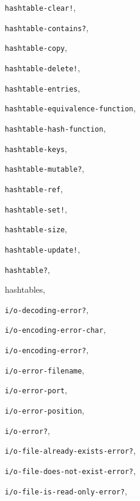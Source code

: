 {\begin{multicols}{2}
\texttt{hashtable-clear!}, \textit{\pageref{objects_s287}}
  
\texttt{hashtable-contains?}, \textit{\pageref{objects_s282}}
  
\texttt{hashtable-copy}, \textit{\pageref{objects_s286}}
  
\texttt{hashtable-delete!}, \textit{\pageref{objects_s284}}
  
\texttt{hashtable-entries}, \textit{\pageref{objects_s289}}
  
\texttt{hashtable-equivalence-function}, \textit{\pageref{objects_s278}}
  
\texttt{hashtable-hash-function}, \textit{\pageref{objects_s278}}
  
\texttt{hashtable-keys}, \textit{\pageref{objects_s288}}
  
\texttt{hashtable-mutable?}, \textit{\pageref{objects_s277}}
  
\texttt{hashtable-ref}, \textit{\pageref{objects_s281}}
  
\texttt{hashtable-set!}, \textit{\pageref{objects_s280}}
  
\texttt{hashtable-size}, \textit{\pageref{objects_s285}}
  
\texttt{hashtable-update!}, \textit{\pageref{objects_s283}}
  
\texttt{hashtable?}, \textit{\pageref{objects_s25}}
  
hashtables, \pageref{objects_s272}
  
\texttt{i/o-decoding-error?}, \textit{\pageref{exceptions_s42}}
  
\texttt{i/o-encoding-error-char}, \textit{\pageref{exceptions_s43}}
  
\texttt{i/o-encoding-error?}, \textit{\pageref{exceptions_s43}}
  
\texttt{i/o-error-filename}, \textit{\pageref{exceptions_s36}}
  
\texttt{i/o-error-port}, \textit{\pageref{exceptions_s41}}
  
\texttt{i/o-error-position}, \textit{\pageref{exceptions_s35}}
  
\texttt{i/o-error?}, \textit{\pageref{exceptions_s32}}
  
\texttt{i/o-file-already-exists-error?}, \textit{\pageref{exceptions_s39}}
  
\texttt{i/o-file-does-not-exist-error?}, \textit{\pageref{exceptions_s40}}
  
\texttt{i/o-file-is-read-only-error?}, \textit{\pageref{exceptions_s38}}
  

\end{multicols}}
